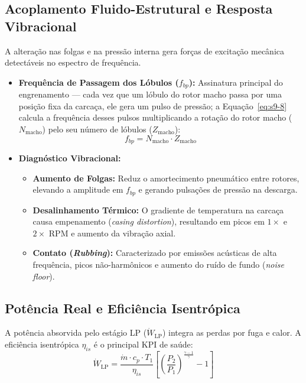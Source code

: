 \documentclass[12pt,a4paper]{article}
\numberwithin{equation}{section}
\numberwithin{table}{section}
\numberwithin{figure}{section}
\begin{document}
	\subsection{\textbf{Acoplamento Fluido-Estrutural e Resposta Vibracional}}
	A alteração nas folgas e na pressão interna gera forças de excitação mecânica detectáveis no espectro de frequência.
	\begin{itemize}
		\item \textbf{Frequência de Passagem dos Lóbulos ($f_{bp}$):} Assinatura principal do engrenamento — cada vez que um lóbulo do rotor macho passa por uma posição fixa da carcaça, ele gera um pulso de pressão; a Equação~\eqref{eq:s9-8} calcula a frequência desses pulsos multiplicando a rotação do rotor macho ($N_{\text{macho}}$) pelo seu número de lóbulos ($Z_{\text{macho}}$):
		\begin{equation}\label{eq:s9-8}
 f_{bp} = N_{\text{macho}} \cdot Z_{\text{macho}}
\end{equation}
		\item \textbf{Diagnóstico Vibracional:}
		\begin{itemize}
			\item \textbf{Aumento de Folgas:} Reduz o amortecimento pneumático entre rotores, elevando a amplitude em $f_{bp}$ e gerando pulsações de pressão na descarga.
			\item \textbf{Desalinhamento Térmico:} O gradiente de temperatura na carcaça causa empenamento (\textit{casing distortion}), resultando em picos em $1 \times$ e $2 \times$ RPM e aumento da vibração axial.
			\item \textbf{Contato (\textit{Rubbing}):} Caracterizado por emissões acústicas de alta frequência, picos não-harmônicos e aumento do ruído de fundo (\textit{noise floor}).
		\end{itemize}
	\end{itemize}
	
	\subsection{\textbf{Potência Real e Eficiência Isentrópica}}
	A potência absorvida pelo estágio LP ($\dot{W}_{\text{LP}}$) integra as perdas por fuga e calor. A eficiência isentrópica $\eta_{is}$ é o principal KPI de saúde:
	\begin{equation}\label{eq:s9-9}
 \dot{W}_{\text{LP}} = \frac{\dot{m} \cdot c_p \cdot T_1}{\eta_{is}} \left[ \left( \frac{P_2}{P_1} \right)^{\frac{\gamma - 1}{\gamma}} - 1 \right] 
\end{equation}
	
\end{document}
